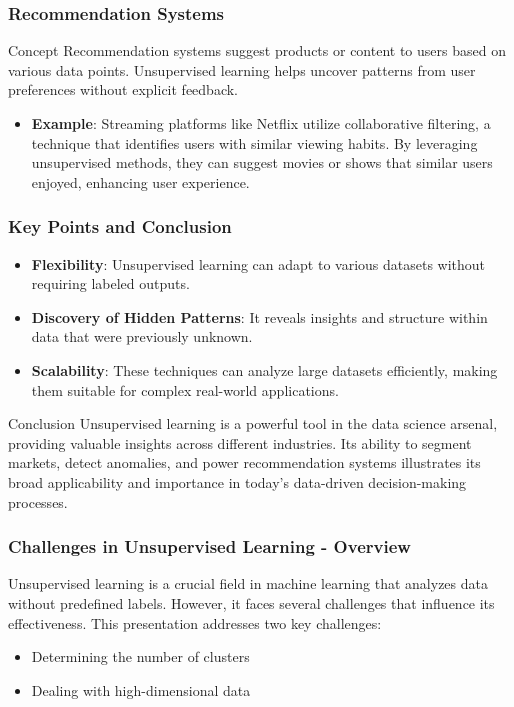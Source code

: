 \documentclass[aspectratio=169]{beamer}
\begin{document}
\begin{frame}[fragile]
    \frametitle{Recommendation Systems}
    \begin{block}{Concept}
        Recommendation systems suggest products or content to users based on various data points. Unsupervised learning helps uncover patterns from user preferences without explicit feedback.
    \end{block}
    \begin{itemize}
        \item \textbf{Example}: Streaming platforms like Netflix utilize collaborative filtering, a technique that identifies users with similar viewing habits. By leveraging unsupervised methods, they can suggest movies or shows that similar users enjoyed, enhancing user experience.
    \end{itemize}
\end{frame}

\begin{frame}[fragile]
    \frametitle{Key Points and Conclusion}
    \begin{itemize}
        \item \textbf{Flexibility}: Unsupervised learning can adapt to various datasets without requiring labeled outputs.
        \item \textbf{Discovery of Hidden Patterns}: It reveals insights and structure within data that were previously unknown.
        \item \textbf{Scalability}: These techniques can analyze large datasets efficiently, making them suitable for complex real-world applications.
    \end{itemize}
    \begin{block}{Conclusion}
        Unsupervised learning is a powerful tool in the data science arsenal, providing valuable insights across different industries. Its ability to segment markets, detect anomalies, and power recommendation systems illustrates its broad applicability and importance in today’s data-driven decision-making processes.
    \end{block}
\end{frame}

\begin{frame}[fragile]
    \frametitle{Challenges in Unsupervised Learning - Overview}
    Unsupervised learning is a crucial field in machine learning that analyzes data without predefined labels. However, it faces several challenges that influence its effectiveness. This presentation addresses two key challenges:
    \begin{itemize}
        \item Determining the number of clusters
        \item Dealing with high-dimensional data
    \end{itemize}
\end{frame}
\end{document}
